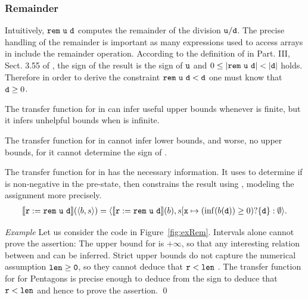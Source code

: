 \documentclass{elsart}
\begin{document}
\subsubsection{Remainder}
Intuitively, $\mathtt{rem}\ \code{u\ d} $ computes the remainder of the division $\mathtt{u / d}$.
The precise handling of the remainder is important as many expressions
used to access arrays in  include the remainder operation.
According to the definition of  in Part. III, Sect. 3.55 of
\cite{ECMA-CLI}, the sign of the result is the sign of $\mathtt{u}$ and
$0 \leq | \mathtt{rem \ u \ d} | < | \mathtt{d} |$ holds. 
Therefore in order to derive the constraint $\code{rem \ u \ d} < \code{d}$ one
must know that $\mathtt{d} \geq 0$.  

The transfer function for  in \Intervals{} can infer useful
upper bounds whenever  is finite, but it infers unhelpful
bounds when  is infinite.

The transfer function for  in \SUB{} cannot infer lower
bounds, and worse, no upper bounds, for it cannot
determine the sign of .

The transfer function for  in \Pentagons{} has the necessary
information. It uses \Intervals{} to determine if  is
non-negative in the pre-state,
then constrains the result using \SUB{}, modeling the assignment more precisely.
\begin{multline*}
\mathbb{}\llbracket \mathtt{r := rem\ u\ d} \rrbracket(\langle b, s \rangle) = \langle \mathbb{}\llbracket \mathtt{r := rem\ u\ d} \rrbracket(b), s[\mathtt{x} \mapsto (\mathrm{inf}(b(\mathtt{d})) \geq 0) ? \{ \mathtt{d} \}: \emptyset   \rangle.
\end{multline*}

\textit{Example}
Let us consider the code in Figure~\ref{fig:exRem}.
Intervals alone cannot prove the assertion: The upper bound for  is $+\infty$, so that any interesting relation between  and  can be inferred.
Strict upper bounds do not capture the numerical assumption $\mathtt{len \geq 0}$, so they cannot deduce that $\mathtt{r} < \mathtt{len}$ .
The transfer function for  for Pentagons is precise enough to deduce from the sign  to deduce that $\mathtt{r} < \mathtt{len}$ and hence to prove the assertion. \qed
\end{document}
